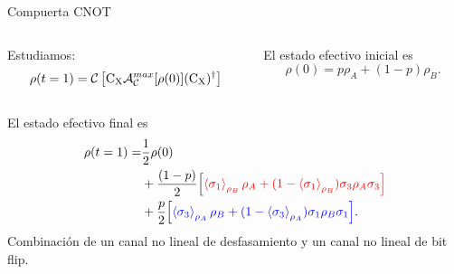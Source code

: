 \begin{frame}{Compuerta CNOT}
    \begin{columns}
        \begin{column}{0.5\textwidth}
            Estudiamos:
            \begin{equation}
                \rho(t=1)=\mathcal{C}\left[\text{C}_{\text{X}} \mathcal{A}_{\mathcal{C}}^{max}[\rho(0)](\text{C}_{\text{X}})^{\dag}\right]\nonumber
            \end{equation}
        \end{column}\pause
        \begin{column}{0.5\textwidth}
            El estado efectivo inicial es
            \begin{equation}
                \rho(0)=p\rho_{A}+(1-p)\rho_{B}.\nonumber
            \end{equation}
        \end{column}\pause
    \end{columns}
    El estado efectivo final es\pause
    \begin{align*}
        \rho(t=1)=&\frac{1}{2}\rho(0)\\
        &+\frac{(1-p)}{2}\qty[{\color{red}\expval{\sigma_{1}}_{\rho_{B}}\rho_{A}+(1-\expval{\sigma_{1}}_{\rho_{B}})\sigma_{3}\rho_{A}\sigma_{3}}]\\
        &+\frac{p}{2}\qty[{\color{blue}\expval{\sigma_{3}}_{\rho_{A}}\rho_{B}+(1-\expval{\sigma_{3}}_{\rho_{A}})\sigma_{1}\rho_{B}\sigma_{1}}].
    \end{align*}\pause
    Combinación de un canal no lineal de {\color{red}desfasamiento} y un canal no lineal de {\color{blue}bit flip}.
\end{frame}
